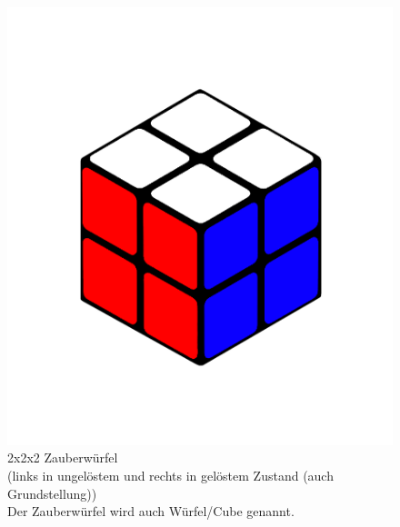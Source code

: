 \documentclass[12pt,a4paper, usenames, dvipsnames]{scrartcl}
\begin{document}
\begin{figure}[h]
\includegraphics[scale=0.1]{2x2solved.png}
\caption{2x2x2 Zauberwürfel \\ (links in ungelöstem und rechts in gelöstem Zustand (auch Grundstellung)) \\
Der Zauberwürfel wird auch Würfel/Cube genannt.}
\end{figure}
\end{document}
